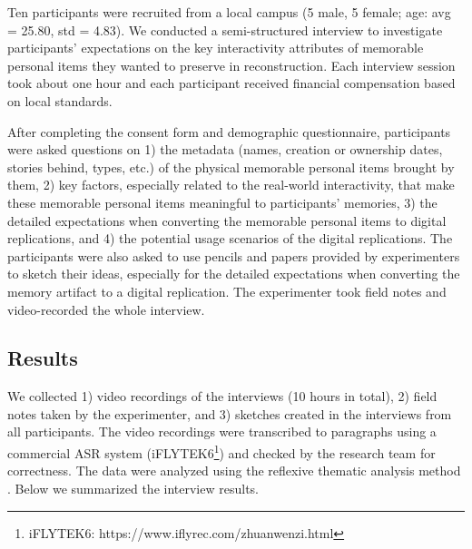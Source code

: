 Ten participants were recruited from a local campus (5 male, 5 female; age: avg = 25.80, std = 4.83). 
We conducted a semi-structured interview to investigate participants' expectations on the key interactivity attributes of memorable personal items they wanted to preserve in reconstruction.
Each interview session took about one hour and each participant received financial compensation based on local standards. 

After completing the consent form and demographic questionnaire, participants were asked questions on 1) the metadata (names, creation or ownership dates, stories behind, types, etc.) of the physical memorable personal items brought by them, 2) key factors, especially related to the real-world interactivity, that make these memorable personal items meaningful to participants' memories, 3) the detailed expectations when converting the memorable personal items to digital replications, and 4) the potential usage scenarios of the digital replications.
The participants were also asked to use pencils and papers provided by experimenters to sketch their ideas, especially for the detailed expectations when converting the memory artifact to a digital replication.
The experimenter took field notes and video-recorded the whole interview.

\subsection{Results}
We collected 1) video recordings of the interviews (10 hours in total), 2) field notes taken by the experimenter, and 3) sketches created in the interviews from all participants.
The video recordings were transcribed to paragraphs using a commercial ASR system (iFLYTEK6\footnote{iFLYTEK6: https://www.iflyrec.com/zhuanwenzi.html}) and checked by the research team for correctness. 
The data were analyzed using the reflexive thematic analysis method \cite{braun2006using}. Below we summarized the interview results.

